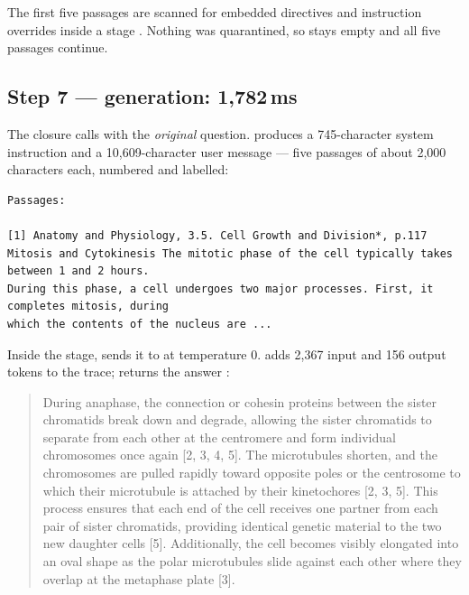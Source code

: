 The first five passages are scanned for embedded directives and instruction overrides inside a  stage . Nothing was quarantined, so  stays empty and all five passages continue.

\subsection{Step 7 --- generation: 1,782\,ms}

The  closure calls  with the \emph{original} question.  produces a 745-character system instruction and a 10,609-character user message --- five passages of about 2,000 characters each, numbered and labelled:

\begin{lstlisting}[language=plain]
Passages:

[1] Anatomy and Physiology, 3.5. Cell Growth and Division*, p.117
Mitosis and Cytokinesis The mitotic phase of the cell typically takes between 1 and 2 hours.
During this phase, a cell undergoes two major processes. First, it completes mitosis, during
which the contents of the nucleus are ...
\end{lstlisting}

Inside the  stage,  sends it to  at temperature 0.  adds 2,367 input and 156 output tokens to the trace;  returns the answer :

\begin{quote}\small
During anaphase, the connection or cohesin proteins between the sister chromatids break down and degrade, allowing the sister chromatids to separate from each other at the centromere and form individual chromosomes once again [2, 3, 4, 5]. The microtubules shorten, and the chromosomes are pulled rapidly toward opposite poles or the centrosome to which their microtubule is attached by their kinetochores [2, 3, 5]. This process ensures that each end of the cell receives one partner from each pair of sister chromatids, providing identical genetic material to the two new daughter cells [5]. Additionally, the cell becomes visibly elongated into an oval shape as the polar microtubules slide against each other where they overlap at the metaphase plate [3].
\end{quote}

